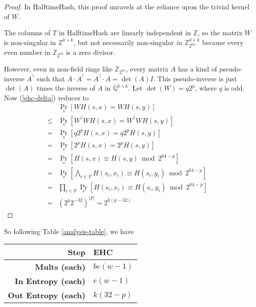 \documentclass[sigconf, nonacm]{acmart}
\newcommand{\rats}{\mathbb{Q}}
\newcommand{\ints}{\mathbb{Z}}
\begin{document}
\begin{proof}
  In HalftimeHash, this proof unravels at the reliance upon the trivial kernel of $W$.

  The columns of $T$ in HalftimeHash are linearly independent in $\ints$, so the matrix $W$ is non-singular in $\ints^{k\times{}k}$, but not necessarily non-singular {\em in $\ints_{2^{64}}^{k\times{}k}$} because every even number in $\ints_{2^{64}}$ is a zero divisor.

  However, even in non-field rings like $\ints_{2^{64}}$, every matrix $A$ has a kind of pseudo-inverse $A^?$ such that $A \cdot A^? = A^? \cdot A = \det(A) I$.
  This pseudo-inverse is just $\det(A)$ times the inverse of $A$ in $\rats^{k\times{}k}$.
  Let $\det(W) = q2^p$, where $q$ is odd.
  Now (\ref{ehc-delta}) reduces to
  \[
  \begin{array}{rl}
    &  \Pr_s[W H(s,x) = W H(s,y)]\\
    \leq & \Pr_s[W^?W H(s,x) = W^?W H(s,y)] \\
    = & \Pr_s[q2^pH(s,x) = q2^pH(s,y)] \\
    = & \Pr_s[2^pH(s,x) = 2^pH(s,y)] \\
    = & \Pr_s[H(s,x) \equiv H(s,y) \bmod 2^{64-p}] \\
    = & \Pr_s\left[\bigwedge_{i \in F} H(s_i,x_i) \equiv H(s_i,y_i) \bmod 2^{64-p}\right] \\
    = & \prod_{i \in F} \Pr_s\left[ H(s_i,x_i) \equiv H(s_i,y_i) \bmod 2^{64-p}\right] \\
    = & \left(2^p 2^{-32}\right)^{|F|} = 2^{k(p-32)}
  \end{array}
  \]
\end{proof}

So following Table \ref{analysis-table}, we have

\begin{tabular}{|r|l|}
    \hline {\bf Step} & {\bf EHC} \\
    \hline {\bf Mults (each)} & $b e (w-1)$ \\
    \hline {\bf In Entropy (each)} & $e (w-1)$ \\
    \hline {\bf Out Entropy (each)} & $k (32-p)$\\
    \hline
\end{tabular}
\end{document}
